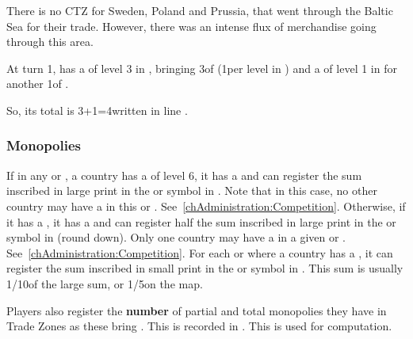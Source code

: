\begin{designnote}
  There is no CTZ for Sweden, Poland and Prussia, that went through the
  Baltic Sea for their trade. However, there was an intense flux of
  merchandise going through this area.
\end{designnote}


\begin{exemple}
  At turn 1, \POR has a \TradeFLEET of level 3 in ,
  bringing 3\ducats of  (1\ducats per level in \STZ)
  and a \TradeFLEET of level 1 in  for another 1\ducats of
  .

  So, its total  is 3+1=4\ducats written in
  line .
\end{exemple}

\subsubsection{Monopolies}
\aparag If in any \CTZ or \STZ, a country has a \TradeFLEET of level 6,
it has a  and can register the sum inscribed in
large print in the \CTZ or \STZ symbol in .
\bparag Note that in this case, no other country may have a \TradeFLEET
in this \CTZ or \STZ. See~\ref{chAdministration:Competition}.
\aparag Otherwise, if it has a \TradeFLEET\faceplus, it has a
 and can register half the sum inscribed in
large print in the \CTZ or \STZ symbol in  (round down).
\bparag Only one country may have a \TradeFLEET\faceplus in a given \CTZ
or \STZ. See~\ref{chAdministration:Competition}.
\aparag For each \CTZ or \STZ where a country has a
\TradeFLEET\facemoins, it can register the sum inscribed in small print
in the \CTZ or \STZ symbol in .
\bparag This sum is usually 1/10\th of the large sum, or 1/5\th on the
\ROTW map.

\aparag Players also register the \textbf{number} of partial and total
monopolies they have in Trade Zones as these bring \VPs. This is
recorded in . This is used
for \VPs computation.

